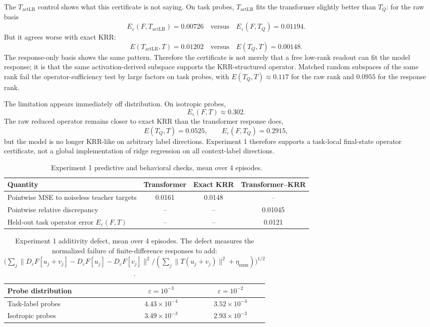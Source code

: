 \documentclass[11pt]{article}
\begin{document}
The \(T_{\mathrm{actLR}}\) control shows what this certificate is not saying. On task probes,
\(T_{\mathrm{actLR}}\) fits the transformer slightly better than \(T_Q\): for the raw basis
\[
E_\varepsilon(F,T_{\mathrm{actLR}})=0.00726
\quad\text{versus}\quad
E_\varepsilon(F,T_Q)=0.01194.
\]
But it agrees worse with exact KRR:
\[
E(T_{\mathrm{actLR}},T)=0.01202
\quad\text{versus}\quad
E(T_Q,T)=0.00148.
\]
The response-only basis shows the same pattern. Therefore the certificate is not merely that a
free low-rank readout can fit the model response; it is that the same activation-derived subspace
supports the KRR-structured operator. Matched random subspaces of the same rank fail the
operator-sufficiency test by large factors on task probes, with \(E(T_Q,T)\approx0.117\) for the raw
rank and \(0.0955\) for the response rank.

The limitation appears immediately off distribution. On isotropic probes,
\[
E_\varepsilon(F,T)\approx0.302.
\]
The raw reduced operator remains closer to exact KRR than the transformer response does,
\[
E(T_Q,T)=0.0525,
\qquad
E_\varepsilon(F,T_Q)=0.2915,
\]
but the model is no longer KRR-like on arbitrary label directions. Experiment 1 therefore supports
a task-local final-state operator certificate, not a global implementation of ridge regression on
all context-label directions.

\begin{table}[htbp]
\centering
\caption{Experiment 1 predictive and behavioral checks, mean over 4 episodes.}
\begin{tabular}{lccc}
\toprule
Quantity & Transformer & Exact KRR & Transformer--KRR\\
\midrule
Pointwise MSE to noiseless teacher targets & 0.0161 & 0.0148 & --\\
Pointwise relative discrepancy & -- & -- & 0.01045\\
Held-out task operator error \(E_\varepsilon(F,T)\) & -- & -- & 0.0121\\
\bottomrule
\end{tabular}
\end{table}

\begin{table}[htbp]
\centering
\caption{Experiment 1 additivity defect, mean over 4 episodes. The defect measures the normalized
failure of finite-difference responses to add:
\(\bigl(\sum_j\|D_\varepsilon F[u_j+v_j]-D_\varepsilon F[u_j]-D_\varepsilon F[v_j]\|^2/
(\sum_j\|T(u_j+v_j)\|^2+\eta_{\mathrm{num}})\bigr)^{1/2}\).}
\begin{tabular}{lcc}
\toprule
Probe distribution & \(\varepsilon=10^{-3}\) & \(\varepsilon=10^{-2}\)\\
\midrule
Task-label probes & \(4.43\times10^{-4}\) & \(3.52\times10^{-4}\)\\
Isotropic probes & \(3.49\times10^{-3}\) & \(2.93\times10^{-3}\)\\
\bottomrule
\end{tabular}
\end{table}
\end{document}

